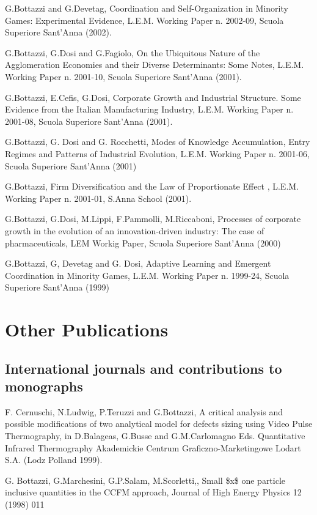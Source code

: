 \documentclass[a4paper]{article}
\begin{document}
G.Bottazzi and G.Devetag, Coordination and Self-Organization
in Minority Games: Experimental Evidence, L.E.M. Working Paper n.
2002-09, Scuola Superiore Sant'Anna (2002).

G.Bottazzi, G.Dosi and G.Fagiolo, On the Ubiquitous Nature
of the Agglomeration Economies and their Diverse Determinants:
Some Notes, L.E.M. Working Paper n. 2001-10, Scuola Superiore Sant'Anna (2001).

G.Bottazzi, E.Cefis, G.Dosi, Corporate Growth and Industrial
Structure. Some Evidence from the Italian Manufacturing Industry,
L.E.M. Working Paper n. 2001-08, Scuola Superiore Sant'Anna (2001).

G.Bottazzi, G. Dosi and G. Rocchetti, Modes of Knowledge
Accumulation, Entry Regimes and Patterns of Industrial Evolution,
L.E.M. Working Paper n. 2001-06, Scuola Superiore Sant'Anna (2001)

G.Bottazzi, Firm Diversification and the Law of Proportionate Effect ,
L.E.M. Working Paper n. 2001-01, S.Anna School (2001).

G.Bottazzi, G.Dosi, M.Lippi, F.Pammolli, M.Riccaboni,
Processes of corporate growth in the evolution of an
innovation-driven industry: The case of pharmaceuticals, LEM
Workig Paper, Scuola Superiore Sant'Anna (2000)

G.Bottazzi, G, Devetag and G. Dosi, Adaptive Learning and
Emergent Coordination in Minority Games, L.E.M. Working Paper n.
1999-24, Scuola Superiore Sant'Anna (1999)


\section{Other Publications%
  \label{other-publications}%
}


\subsection{International journals and contributions to monographs%
  \label{international-journals-and-contributions-to-monographs}%
}

F. Cernuschi, N.Ludwig, P.Teruzzi and G.Bottazzi, A critical analysis
and possible modifications of two analytical model for defects
sizing using Video Pulse Thermography\textquotedbl{}, in D.Balageas, G.Busse and
G.M.Carlomagno Eds. \textquotedbl{}Quantitative Infrared Thermography\textquotedbl{}
Akademickie Centrum Graficzno-Marketingowe Lodart S.A. (Lodz
Polland 1999).

G. Bottazzi, G.Marchesini, G.P.Salam, M.Scorletti,, Small \$x\$ one
particle inclusive quantities in the CCFM approach, Journal of
High Energy Physics 12 (1998) 011
\end{document}

